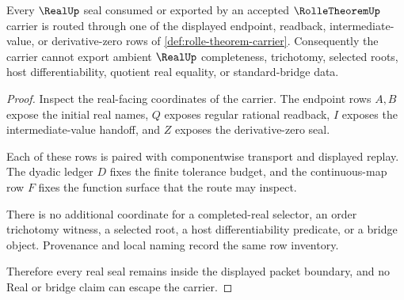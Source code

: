 \begin{theorem}
\label{thm:rolle-theorem-real-seal-nonescape}
Every $\RealUp$ seal consumed or exported by an accepted $\RolleTheoremUp$ carrier is routed through one of the displayed endpoint, readback, intermediate-value, or derivative-zero rows of \autoref{def:rolle-theorem-carrier}. Consequently the carrier cannot export ambient $\RealUp$ completeness, trichotomy, selected roots, host differentiability, quotient real equality, or standard-bridge data.
\end{theorem}
\begin{proof}
Inspect the real-facing coordinates of the carrier. The endpoint rows $A,B$ expose the initial real names, $Q$ exposes regular rational readback, $I$ exposes the intermediate-value handoff, and $Z$ exposes the derivative-zero seal.

Each of these rows is paired with componentwise transport and displayed replay. The dyadic ledger $D$ fixes the finite tolerance budget, and the continuous-map row $F$ fixes the function surface that the route may inspect.

There is no additional coordinate for a completed-real selector, an order trichotomy witness, a selected root, a host differentiability predicate, or a bridge object. Provenance and local naming record the same row inventory.

Therefore every real seal remains inside the displayed packet boundary, and no Real or bridge claim can escape the carrier.
\end{proof}




